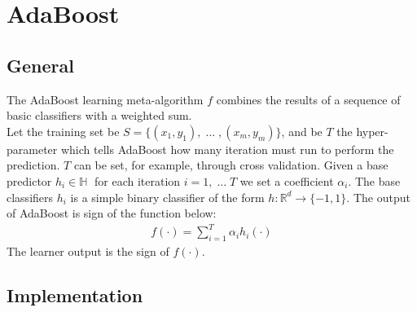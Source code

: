 
\chapter{AdaBoost}
\section{General}
	The AdaBoost learning meta-algorithm $f$ combines the results of a sequence of basic classifiers with a weighted sum. \\
	Let the training set be $S=\lbrace (x_{1}, y_{1}),\; \dots\;, (x_{m}, y_{m}) \rbrace$, and be $T$ the hyper-parameter which tells AdaBoost how many iteration must run to perform the prediction. $T$ can be set, for example, through cross validation. Given a base predictor $h_{i} \in \mathbb{H}\;$ for each iteration $i = 1,\;\dots\;T$ we set a coefficient $\alpha_{i}$. The base classifiers $h_{i}$ is a simple binary classifier of the form $h:\mathbb{R}^{d}\to\lbrace-1, 1\rbrace$. The output of AdaBoost is sign of the function below:
	\begin{align*}
		f(\cdot) = \sum_{i=1}^{T}\alpha_{i}h_{i}(\cdot)
	\end{align*}
	The learner output is the sign of $f(\cdot)$. 
\section{Implementation}